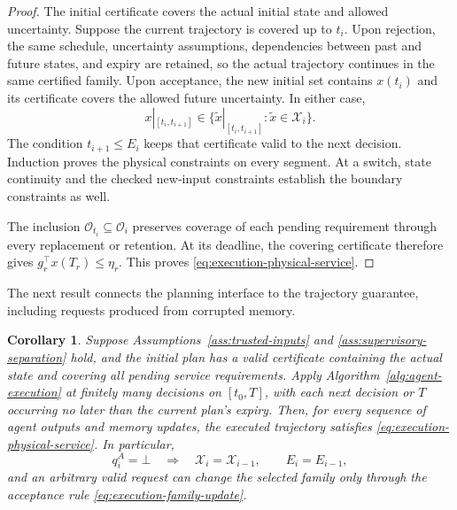 \documentclass[preprint,12pt]{elsarticle}
\theoremstyle{definition}
\theoremstyle{plain}
\newtheorem{corollary}{Corollary}
\theoremstyle{definition}
\theoremstyle{plain}
\begin{document}
\begin{proof}
The initial certificate covers the actual initial state and allowed
uncertainty. Suppose the current trajectory is covered up to $t_i$.
Upon rejection, the same schedule, uncertainty assumptions,
dependencies between past and future states, and expiry are retained, so
the actual trajectory continues in
the same certified family. Upon acceptance, the new initial set contains
$x(t_i)$ and its certificate covers the allowed future uncertainty.
In either case,
\[
 x|_{[t_i,t_{i+1}]}\in
 \{\widetilde x|_{[t_i,t_{i+1}]}:\widetilde x\in\mathcal X_i\}.
\]
The condition $t_{i+1}\le E_i$ keeps that certificate valid to the next
decision. Induction proves the physical constraints on every segment.
At a switch, state continuity and the checked new-input constraints
establish the boundary constraints as well.

The inclusion $\mathcal O_{t_i}\subseteq\mathcal O_i$ preserves coverage
of each pending requirement through every replacement or
retention. At its deadline, the covering certificate therefore gives
$g_r^\top x(T_r)\le\eta_r$. This proves
\eqref{eq:execution-physical-service}.
\end{proof}

The next result connects the planning interface to the trajectory
guarantee, including requests produced from corrupted memory.

\begin{corollary}
\label{cor:agent-independent-execution}
Suppose Assumptions~\ref{ass:trusted-inputs} and
\ref{ass:supervisory-separation} hold, and the initial plan has a valid
certificate containing the actual state and covering all pending service
requirements. Apply Algorithm~\ref{alg:agent-execution} at finitely many
decisions on $[t_0,T]$, with each next decision or $T$ occurring no later
than the current plan's expiry. Then, for every sequence of agent outputs
and memory updates, the executed trajectory satisfies
\eqref{eq:execution-physical-service}. In particular,
\[
q_i^A=\bot
\quad\Longrightarrow\quad
\mathcal X_i=\mathcal X_{i-1},\qquad E_i=E_{i-1},
\]
and an arbitrary valid request can change the selected family only
through the acceptance rule \eqref{eq:execution-family-update}.
\end{corollary}
\end{document}
